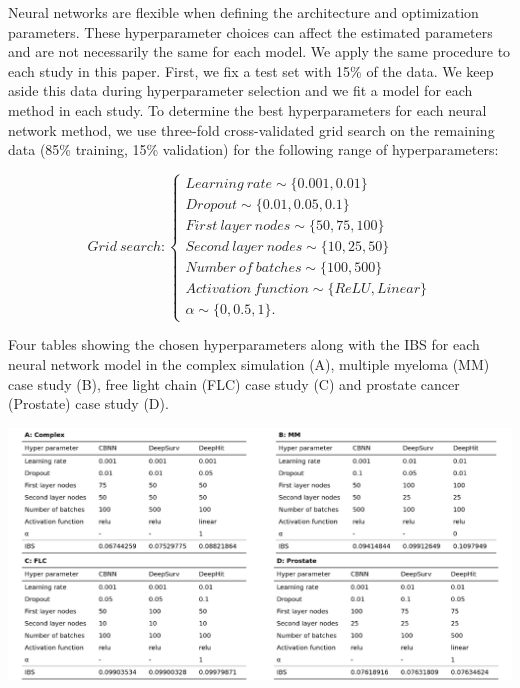 \documentclass[APA,LATO1COL]{WileyNJD-v2}
\begin{document}
Neural networks are flexible when defining the architecture and optimization parameters.
These hyperparameter choices can affect the estimated parameters and are not necessarily
the same for each model. We apply the same procedure to each study in this paper. First,
we fix a test set with 15\% of the data. We keep aside this data during hyperparameter
selection and we fit a model for each method in each study. To determine the best
hyperparameters for each neural network method, we use three-fold cross-validated grid
search \citep{gulli2017} on the remaining data (85\% training, 15\% validation) for the
following range of hyperparameters:

\[
Grid\ search: \begin{cases}
Learning\ rate \sim \{0.001, 0.01\} \\ %
Dropout \sim \{0.01,0.05, 0.1\} \\
First\ layer\ nodes \sim \{50, 75, 100\} \\
Second\ layer\ nodes \sim \{10,25,50\} \\
Number\ of\ batches \sim \{100, 500\} \\
Activation\ function \sim \{ReLU, Linear\}\\
\alpha \sim \{0, 0.5, 1\}.
\end{cases}
\] 

\begin{table}
\caption{Four tables showing the chosen hyperparameters along with the IBS for each neural network model in the complex simulation (A), multiple myeloma (MM) case study (B), free light chain (FLC) case study (C) and prostate cancer (Prostate) case study (D).}
\label{tab:wins}
\begin{center}\includegraphics[width=1\linewidth]{../figures/winTable} \end{center}
\end{table}
\end{document}
